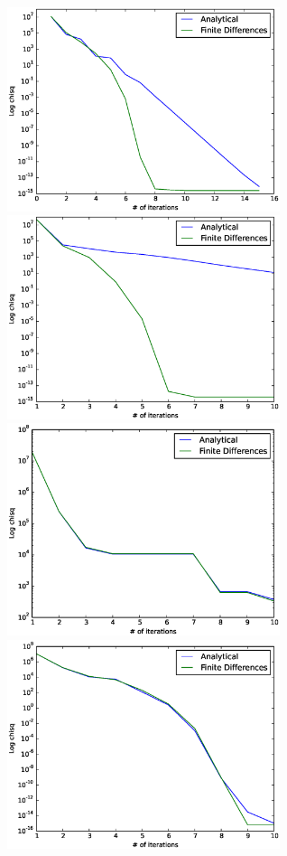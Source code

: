 \documentclass[a4paper,10pt]{article}
\begin{document}
\begin{figure}
 \includegraphics[width=8cm]{convergence2.eps}
 \includegraphics[width=8cm]{convergence3.eps}
 \includegraphics[width=8cm]{convergence4.eps}
 \includegraphics[width=8cm]{convergence5.eps}
\end{figure}
\end{document}

